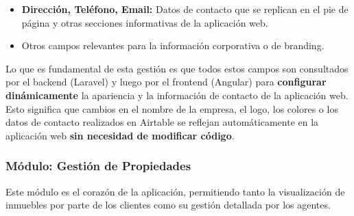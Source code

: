 \begin{enumerate}
\begin{itemize}
        \item \textbf{Dirección, Teléfono, Email:} Datos de contacto que se replican en el pie de página y otras secciones informativas de la aplicación web.

        \item Otros campos relevantes para la información corporativa o de branding.
    \end{itemize}

    Lo que es fundamental de esta gestión es que todos estos campos son consultados por el backend (Laravel) y luego por el frontend (Angular) para \textbf{configurar dinámicamente} la apariencia y la información de contacto de la aplicación web. Esto significa que cambios en el nombre de la empresa, el logo, los colores o los datos de contacto realizados en Airtable se reflejan automáticamente en la aplicación web \textbf{sin necesidad de modificar código}.

\end{enumerate}


\subsubsection{Módulo: Gestión de Propiedades}


Este módulo es el corazón de la aplicación, permitiendo tanto la visualización de inmuebles por parte de los clientes como su gestión detallada por los agentes.

